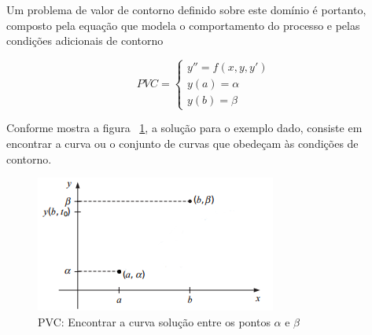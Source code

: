 Um problema de valor de contorno definido sobre este domínio é portanto, composto pela equação que modela o comportamento do processo e pelas condições adicionais de contorno


\begin{equation}
    \label{eq:pvc}
    PVC = 
    \begin{cases}
        y'' = f(x, y, y') \\
        y(a) = \alpha \\
        y(b) = \beta
    \end{cases}
\end{equation}

Conforme mostra a figura ~\ref{fig:pvc}, a solução para o exemplo dado, consiste em encontrar a curva ou o conjunto de curvas que obedeçam às condições de contorno.

\begin{figure}[ht!]
\centering
\includegraphics[scale=0.8]{figuras/PVC.png}
\caption{PVC: Encontrar a curva solução entre os pontos $ \alpha $ e $ \beta $}
\label{fig:pvc}
\end{figure}
